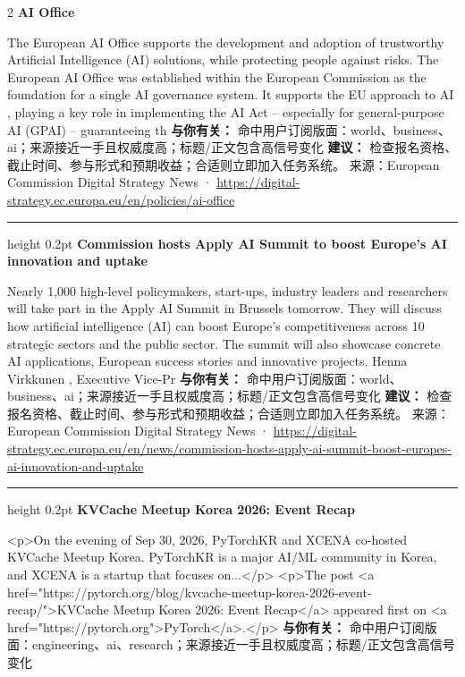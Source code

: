 \documentclass[10.5pt]{ctexart}
\begin{document}
\begin{multicols}{2}
{\large\bfseries AI Office}\par
The European AI Office supports the development and adoption of trustworthy Artificial Intelligence (AI) solutions, while protecting people against risks. The European AI Office was established within the European Commission as the foundation for a single AI governance system. It supports the EU approach to AI , playing a key role in implementing the AI Act – especially for general-purpose AI (GPAI) – guaranteeing th
\textbf{与你有关：} 命中用户订阅版面：world、business、ai；来源接近一手且权威度高；标题/正文包含高信号变化
\textbf{建议：} 检查报名资格、截止时间、参与形式和预期收益；合适则立即加入任务系统。
{\footnotesize\color{ormuted} 来源：European Commission Digital Strategy News · \url{https://digital-strategy.ec.europa.eu/en/policies/ai-office}}
\vspace{2mm}
\hrule height 0.2pt
\vspace{2mm}
{\large\bfseries Commission hosts Apply AI Summit to boost Europe’s AI innovation and uptake}\par
Nearly 1,000 high-level policymakers, start-ups, industry leaders and researchers will take part in the Apply AI Summit in Brussels tomorrow. They will discuss how artificial intelligence (AI) can boost Europe’s competitiveness across 10 strategic sectors and the public sector. The summit will also showcase concrete AI applications, European success stories and innovative projects. Henna Virkkunen , Executive Vice-Pr
\textbf{与你有关：} 命中用户订阅版面：world、business、ai；来源接近一手且权威度高；标题/正文包含高信号变化
\textbf{建议：} 检查报名资格、截止时间、参与形式和预期收益；合适则立即加入任务系统。
{\footnotesize\color{ormuted} 来源：European Commission Digital Strategy News · \url{https://digital-strategy.ec.europa.eu/en/news/commission-hosts-apply-ai-summit-boost-europes-ai-innovation-and-uptake}}
\vspace{2mm}
\hrule height 0.2pt
\vspace{2mm}
{\large\bfseries KVCache Meetup Korea 2026: Event Recap}\par
<p>On the evening of Sep 30, 2026, PyTorchKR and XCENA co-hosted KVCache Meetup Korea. PyTorchKR is a major AI/ML community in Korea, and XCENA is a startup that focuses on...</p> <p>The post <a href="https://pytorch.org/blog/kvcache-meetup-korea-2026-event-recap/">KVCache Meetup Korea 2026: Event Recap</a> appeared first on <a href="https://pytorch.org">PyTorch</a>.</p>
\textbf{与你有关：} 命中用户订阅版面：engineering、ai、research；来源接近一手且权威度高；标题/正文包含高信号变化

\end{multicols}
\end{document}
